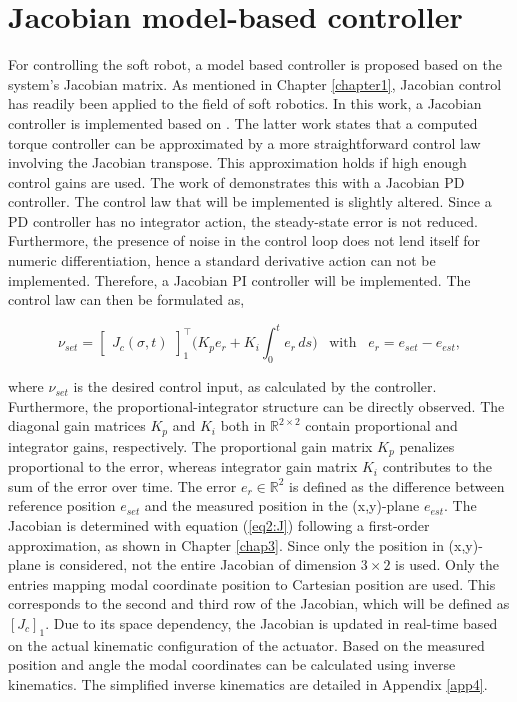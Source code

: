 \section{Jacobian model-based controller}


For controlling the soft robot, a model based controller is proposed based on the system's Jacobian matrix. As mentioned in Chapter \ref{chapter1}, Jacobian control has readily been applied to the field of soft robotics. In this work, a Jacobian controller is implemented based on \cite{MOOSAVIAN20071226}. The latter work states that a computed torque controller can be approximated by a more straightforward control law involving the Jacobian transpose. This approximation holds if high enough control gains are used. The work of \cite{MOOSAVIAN20071226} demonstrates this with a Jacobian PD controller. The control law that will be implemented is slightly altered. Since a PD controller has no integrator action, the steady-state error is not reduced. Furthermore, the presence of noise in the control loop does not lend itself for numeric differentiation, hence a standard derivative action can not be implemented. Therefore, a Jacobian PI controller will be implemented. The control law can then be formulated as,


\begin{equation}
    \nu_{set} = \begin{bmatrix}J_c(\sigma,t)\end{bmatrix}_1^\top \Big(K_p e_r + K_i \int_0^t e_r \hspace{2pt} ds \Big) \hspace{10pt} \text{with} \hspace{10pt} e_r = e_{set}-e_{est}, 
    \label{eq:tau}
\end{equation}

where $\nu_{set}$ is the desired control input, as calculated by the controller. Furthermore, the proportional-integrator structure can be directly observed. The diagonal gain matrices $K_p$ and $K_i$ both in $\mathbb{R}^{2\times 2}$ contain proportional and integrator gains, respectively. The proportional gain matrix $K_p$ penalizes proportional to the error, whereas integrator gain matrix $K_i$ contributes to the sum of the error over time. The error $e_r \in \mathbb{R}^2$ is defined as the difference between reference position $e_{set}$ and the measured position in the (x,y)-plane $e_{est}$. The Jacobian is determined with equation (\ref{eq2:J}) following a first-order approximation, as shown in Chapter \ref{chap3}. Since only the position in (x,y)-plane is considered, not the entire Jacobian of dimension $3 \times 2$ is used. Only the entries mapping modal coordinate position to Cartesian position are used. This corresponds to the second and third row of the Jacobian, which will be defined as $[J_c]_1$. Due to its space dependency, the Jacobian is updated in real-time based on the actual kinematic configuration of the actuator. Based on the measured position and angle the modal coordinates can be calculated using inverse kinematics. The simplified inverse kinematics are detailed in Appendix \ref{app4}.

